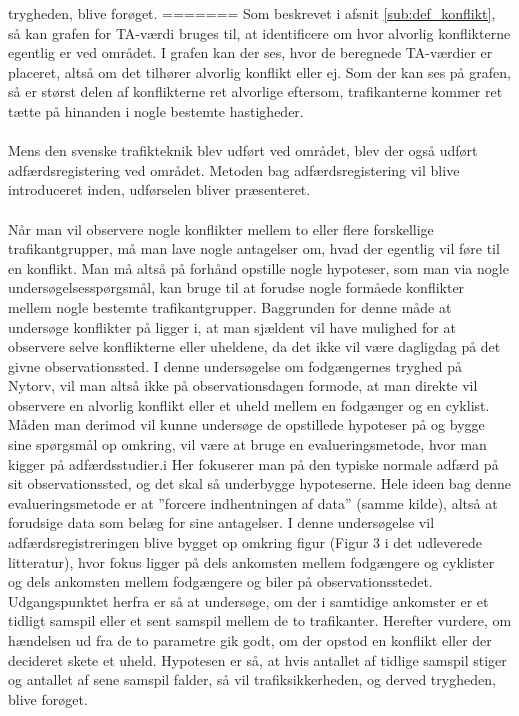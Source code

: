 trygheden, blive forøget.
=======
Som beskrevet i afsnit \cref{sub:def_konflikt}, så kan grafen for TA-værdi bruges til, at identificere om hvor alvorlig konflikterne egentlig er ved området. I grafen kan der ses, hvor de beregnede TA-værdier er placeret, altså om det tilhører alvorlig konflikt eller ej.
Som der kan ses på grafen, så er størst delen af konflikterne ret alvorlige eftersom, trafikanterne kommer ret tætte på hinanden i nogle bestemte hastigheder.
\\\\
Mens den svenske trafikteknik blev udført ved området, blev der også udført adfærdsregistering ved området. Metoden bag adfærdsregistering vil blive introduceret inden, udførselen bliver præsenteret.\\\\
Når	man	vil	observere	nogle	konflikter	mellem	to	eller	flere	forskellige trafikantgrupper,	må	man	lave	nogle	antagelser	om,	hvad	der	egentlig	vil	føre	til	en konflikt.	Man	må	altså	på	forhånd	opstille	nogle	hypoteser,	som	man	via	nogle undersøgelsesspørgsmål,	kan	bruge	til	at	forudse	nogle	formåede	konflikter	mellem nogle	bestemte	trafikantgrupper.	Baggrunden	for	denne	måde	at	undersøge konflikter	på ligger	i,	at	man	sjældent	vil	have	mulighed	for	at	observere	selve konflikterne	eller	uheldene,	da	det	ikke	vil	være	dagligdag	på	det	givne observationssted.	I	denne	undersøgelse	om	fodgængernes	tryghed	på	Nytorv,	vil man altså	ikke	på	observationsdagen	formode,	at	man direkte	vil	observere en alvorlig	konflikt	eller	et	uheld	mellem	en	fodgænger	og	en	cyklist.	Måden	man derimod	vil	kunne	undersøge	de	opstillede	hypoteser	på	og	bygge	sine	spørgsmål	op omkring,	vil	være	at	bruge	en	evalueringsmetode,	hvor	man	kigger	på adfærdsstudier.i Her	fokuserer	man	på	den	typiske	normale	adfærd	på	sit observationssted, og	det	skal	så	underbygge	hypoteserne. Hele	ideen	bag	denne evalueringsmetode	er	at	”forcere indhentningen	af	data”	(samme	kilde),	altså	at forudsige	data	som	belæg	for	sine	antagelser.
I	denne	undersøgelse	vil	adfærdsregistreringen	blive	bygget	op	omkring	figur	(Figur 3	i	det	udleverede	litteratur),	hvor	fokus	ligger	på	dels	ankomsten	mellem fodgængere	og	cyklister	og	dels	ankomsten	mellem	fodgængere	og	biler på observationsstedet. Udgangspunktet	herfra	er	så	at	undersøge,	om	der	i	samtidige ankomster	er	et	tidligt	samspil	eller	et	sent	samspil	mellem	de	to	trafikanter. Herefter	vurdere,	om	hændelsen ud	fra	de	to	parametre	gik	godt,	om	der	opstod	en konflikt	eller	der	decideret	skete	et	uheld.	Hypotesen	er	så,	at	hvis	antallet	af	tidlige samspil	stiger	og	antallet	af	sene	samspil	falder,	så	vil	trafiksikkerheden,	og	derved trygheden,	blive	forøget.
